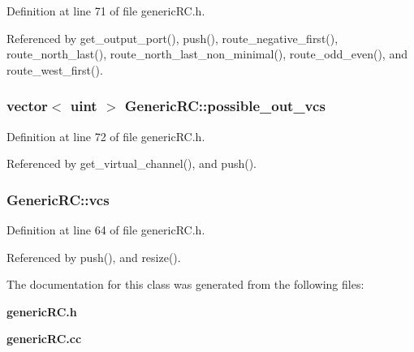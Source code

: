 Definition at line 71 of file genericRC.h.

Referenced by get\_\-output\_\-port(), push(), route\_\-negative\_\-first(), route\_\-north\_\-last(), route\_\-north\_\-last\_\-non\_\-minimal(), route\_\-odd\_\-even(), and route\_\-west\_\-first().
\subsubsection[{possible\_\-out\_\-vcs}]{\setlength{\rightskip}{0pt plus 5cm}vector$<$ {\bf uint} $>$ {\bf GenericRC::possible\_\-out\_\-vcs}\hspace{0.3cm}{\tt  [private]}}\label{classGenericRC_b5f4f7b68f1c72e19e22220b293a399a}




Definition at line 72 of file genericRC.h.

Referenced by get\_\-virtual\_\-channel(), and push().
\subsubsection[{vcs}]{ {\bf GenericRC::vcs}\hspace{0.3cm}{\tt  [private]}}\label{classGenericRC_d6ab0895975afb3d0607c1497840d651}




Definition at line 64 of file genericRC.h.

Referenced by push(), and resize().

The documentation for this class was generated from the following files:\begin{CompactItemize}
\item 
{\bf genericRC.h}\item 
{\bf genericRC.cc}\end{CompactItemize}
